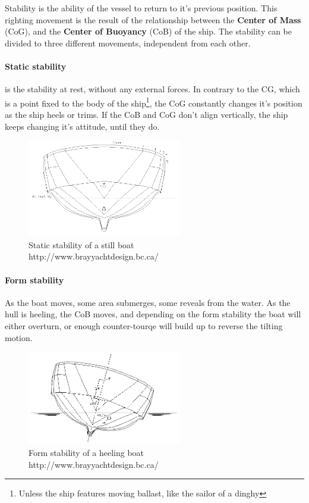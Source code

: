 Stability is the ability of the vessel to return to it's previous position\cite{stability}. This righting movement is the result of the relationship between the \textbf{Center of Mass} (CoG), and the \textbf{Center of Buoyancy} (CoB) of the ship. The stability can be divided to three different movements, independent from each other.

\paragraph{Static stability} is the stability at rest, without any external forces. In contrary to the CG, which is a point fixed to the body of the ship\footnote{Unless the ship features moving ballast, like the sailor of a dinghy}, the CoG constantly changes it's position as the ship heels or trims. If the CoB and CoG don't align vertically, the ship keeps changing it's attitude, until they do.

\begin{figure}[H]
	\centering
	\includegraphics[width=0.6\textwidth]{img3/stability0}
	\caption{Static stability of a still boat\\http://www.brayyachtdesign.bc.ca/}
	\label{fig:stability0}
\end{figure}

\paragraph{Form stability} As the boat moves, some area submerges, some reveals from the water. As the hull is heeling, the CoB moves, and depending on the form stability the boat will either overturn, or enough counter-tourqe will build up to reverse the tilting motion.

\begin{figure}[H]
	\centering
	\includegraphics[width=0.6\textwidth]{img3/stability1}
	\caption{Form stability of a heeling boat\\http://www.brayyachtdesign.bc.ca/}
	\label{fig:stability1}
\end{figure}

